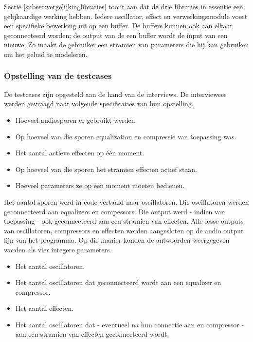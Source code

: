 Sectie \ref{subsec:vergelijkinglibraries} toont aan dat de drie libraries in essentie een gelijkaardige werking hebben. Iedere oscillator, effect en verwerkingsmodule voert een specifieke bewerking uit op een buffer. De buffers kunnen ook aan elkaar geconnecteerd worden; de output van de een buffer wordt de input van een nieuwe. Zo maakt de gebruiker een stramien van parameters die hij kan gebruiken om het geluid te modeleren.

\subsubsection{Opstelling van de testcases}

De testcases zijn opgesteld aan de hand van de interviews. De interviewees werden gevraagd naar volgende specificaties van hun opstelling. 

\begin{itemize}
	\item Hoeveel audiosporen er gebruikt werden.
	\item Op hoeveel van die sporen equalization en compressie van toepassing was.
	\item Het aantal actieve effecten op één moment.
	\item Op hoeveel van die sporen het stramien effecten actief staan.
	\item Hoeveel parameters ze op één moment moeten bedienen.
\end{itemize}

Het aantal sporen werd in code vertaald naar oscillatoren. Die oscillatoren werden geconnecteerd aan equalizers en compessors. Die output werd - indien van toepassing - ook geconnecteerd aan een stramien van effecten. Alle losse outputs van oscillatoren, compressors en effecten werden aangesloten op de audio output lijn van het programma. Op die manier konden de antwoorden weergegeven worden als vier integere parameters.

\begin{itemize}
	\item Het aantal oscillatoren.
	\item Het aantal oscillatoren dat geconnecteerd wordt aan een equalizer en compressor.
	\item Het aantal effecten.
	\item Het aantal oscillatoren dat - eventueel na hun connectie aan en compressor - aan een stramien van effecten geconnecteerd wordt.
\end{itemize}

